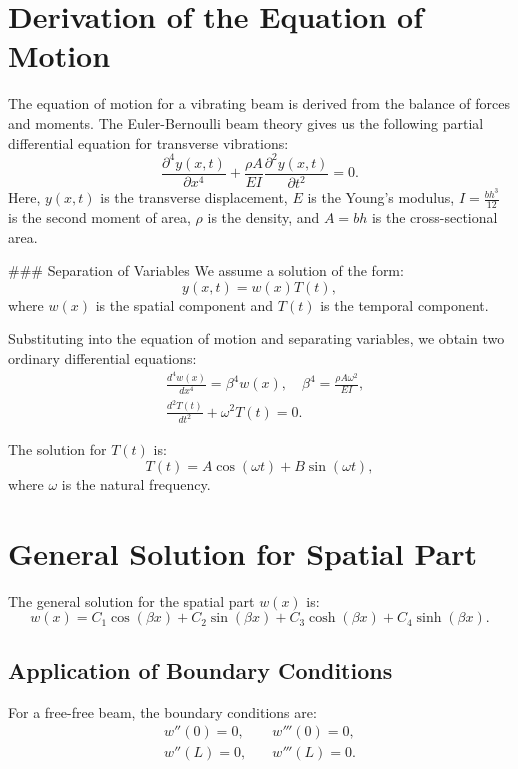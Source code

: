 \documentclass[12pt,a4paper]{article}
\begin{document}
\section{Derivation of the Equation of Motion}
The equation of motion for a vibrating beam is derived from the balance of forces and moments. The Euler-Bernoulli beam theory gives us the following partial differential equation for transverse vibrations:
\begin{equation}
    \frac{\partial^4 y(x,t)}{\partial x^4} + \frac{\rho A}{EI} \frac{\partial^2 y(x,t)}{\partial t^2} = 0.
\end{equation}
Here, \( y(x,t) \) is the transverse displacement, \( E \) is the Young's modulus, \( I = \frac{bh^3}{12} \) is the second moment of area, \( \rho \) is the density, and \( A = bh \) is the cross-sectional area.

### Separation of Variables
We assume a solution of the form:
\begin{equation}
    y(x,t) = w(x) T(t),
\end{equation}
where \( w(x) \) is the spatial component and \( T(t) \) is the temporal component.

Substituting into the equation of motion and separating variables, we obtain two ordinary differential equations:
\begin{align}
    &\frac{d^4 w(x)}{dx^4} = \beta^4 w(x), \quad \beta^4 = \frac{\rho A \omega^2}{EI}, \\
    &\frac{d^2 T(t)}{dt^2} + \omega^2 T(t) = 0.
\end{align}

The solution for \( T(t) \) is:
\begin{equation}
    T(t) = A \cos(\omega t) + B \sin(\omega t),
\end{equation}
where \( \omega \) is the natural frequency.

\section{General Solution for Spatial Part}
The general solution for the spatial part \( w(x) \) is:
\begin{equation}
    w(x) = C_1 \cos(\beta x) + C_2 \sin(\beta x) + C_3 \cosh(\beta x) + C_4 \sinh(\beta x).
\end{equation}

\subsection{Application of Boundary Conditions}
For a free-free beam, the boundary conditions are:
\begin{align}
    w''(0) = 0, & \quad w'''(0) = 0, \\
    w''(L) = 0, & \quad w'''(L) = 0.
\end{align}
\end{document}
